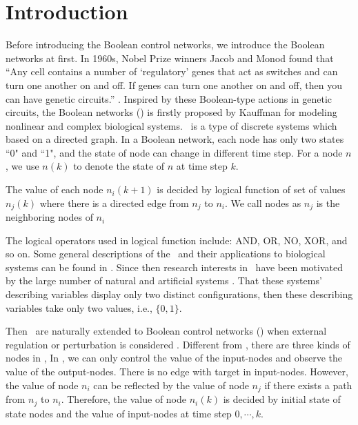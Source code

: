 \section{Introduction}
\label{sec:intro}


Before introducing the Boolean control networks, we introduce the Boolean networks at first. In 1960s, Nobel Prize winners Jacob and Monod found that ``Any cell contains a number of `regulatory' genes that act as switches and can turn one another on and off. If genes can turn one another on and off, then you can have genetic circuits.'' \cite{Jacob1961Genetic}. Inspired by these Boolean-type actions in genetic circuits, the Boolean networks (\BNs) is firstly proposed by Kauffman \cite{Kauffman1968Metabolic} for modeling nonlinear and complex biological systems. \BNs\ is a type of discrete systems which based on a directed graph. In a Boolean network, each node has only two states ``0" and ``1", and
the state of   node can change in different  time step.  For a node $n$, we use $n(k)$ to denote the state of $n$ at time step $k$.

The value of each node $n_i(k+1)$ is decided by logical function of  set of  values  $n_j(k)$  where  there is a directed edge from $n_j$ to $n_i$. We call nodes as $n_j$ is the neighboring nodes of $n_i$  

 The logical operators used in  logical function include: AND, OR, NO, XOR, and so on. Some general descriptions of the \BNs\ and their applications to biological systems can be found in \cite{Kauffman1968Metabolic}. Since then research interests in \BNs\ have been motivated by the large number of natural and artificial systems \cite{Akutsu2000Inferring, Shmulevich2002From, Faur2006Dynamical,Green2007The,Lou2010Multi}. That these systems' describing variables display only two distinct configurations, then these describing variables take only two values, i.e., $\{0,1\}$.

        Then \BNs\ are naturally extended to Boolean control networks (\BCNs) when external regulation or perturbation is considered \cite{Ideker2001A}. Different from \BNs, there are three kinds of nodes in \BCNs,  In \BCNs, we can only control the value of the input-nodes and observe the value of the output-nodes.  There is no edge with target in input-nodes.
However,  the value of node $n_i$ can be reflected by the value of  node $n_j$ if there exists a 
path from $n_j$ to $n_i$. Therefore,  the value of node $n_i(k)$  is decided by initial state of state nodes and the value of input-nodes  at time step $0,\cdots, k$.


